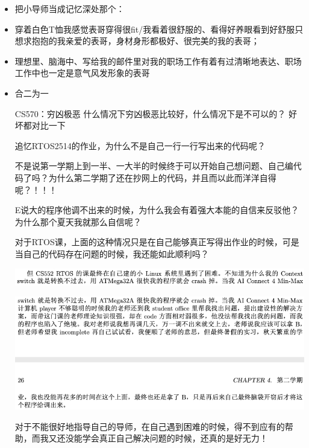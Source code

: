 \documentclass[9pt, b5paper]{article}
\begin{document}
\begin{itemize}
\item 把小导师当成记忆深处那个：
\item 穿着白色T恤我感觉表哥穿得很fit/我看着很舒服的、看得好养眼看到好舒服只想求抱抱的我亲爱的表哥，身材身形都极好、很完美的我的表哥；
\item 理想里、脑海中、写给我的邮件里对我的职场工作有着有过清晰地表达、职场工作中也一定是意气风发形象的表哥
\item 合二为一

CS570：穷凶极恶
什么情况下穷凶极恶比较好，什么情况下是不可以的？
好坏都对比一下

追忆RTOS2514的作业，为什么不是自己一行一行写出来的代码呢？

不是说第一学期上到一半、一大半的时候终于可以开始自己想问题、自己编代码了吗？为什么第二学期了还在抄网上的代码，并且而以此而洋洋自得呢？！！！

E说大的程序他调不出来的时候，为什么我会有着强大本能的自信来反驳他？为什么那个夏天我就那么自信呢？

对于RTOS课，上面的这种情况只是在自己能够真正写得出作业的时候，可是当自己的代码存在问题的时候，我还能如此顺利吗？

\begin{center}
\includegraphics[width=.9\linewidth]{./pic/backups_plans_20210424_215728.png}
\end{center}

\begin{center}
\includegraphics[width=.9\linewidth]{./pic/backups_plans_20210424_215743.png}
\end{center}

对于不能很好地指导自己的导师，在自己遇到困难的时候，得不到应有的帮助，而我又还没能学会真正自己解决问题的时候，还真的是好无力！
\end{itemize}
\end{document}
